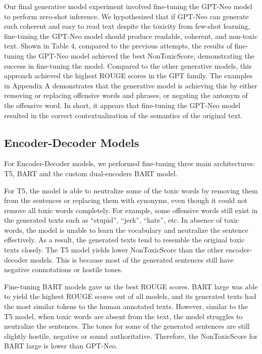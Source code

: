 \documentclass[11pt]{article}
\begin{document}
Our final generative model experiment involved fine-tuning the GPT-Neo model to perform zero-shot inference. We hypothesized that if GPT-Neo can generate such coherent and easy to read text despite the toxicity from few-shot learning, fine-tuning the GPT-Neo model should produce readable, coherent, and non-toxic text. Shown in Table 4, compared to the previous attempts, the results of fine-tuning the GPT-Neo model achieved the best NonToxicScore, demonstrating the success in fine-tuning the model. Compared to the other generative models, this approach achieved the highest ROUGE scores in the GPT family. The examples in Appendix A demonstrates that the generative model is achieving this by either removing or replacing offensive words and phrases, or negating the antonym of the offensive word. In short, it appears that fine-tuning the GPT-Neo model resulted in the correct contextualization of the semantics of the original text.

\subsection{Encoder-Decoder Models}

For Encoder-Decoder models, we performed fine-tuning three main architectures: T5, BART and the custom dual-encoders BART model.

For T5, the model is able to neutralize some of the toxic words by removing them from the sentences or replacing them with synonyms, even though it could not remove all toxic words completely. For example, some offensive words still exist in the generated texts such as “stupid”, “jerk”, “hate”, etc. In absence of toxic words, the model is unable to learn the vocabulary and neutralize the sentence effectively. As a result, the generated texts tend to resemble the original toxic texts closely. The T5 model yields lower NonToxicScore than the other encoder-decoder models. This is because most of the generated sentences still have negative connotations or hostile tones.

Fine-tuning BART models gave us the best ROUGE scores. BART large was able to yield the highest ROUGE scores out of all models, and its generated texts had the most similar tokens to the human annotated texts. However, similar to the T5 model, when toxic words are absent from the text, the model struggles to neutralize the sentences. The tones for some of the generated sentences are still slightly hostile, negative or sound authoritative. Therefore, the NonToxicScore for BART large is lower than GPT-Neo.
\end{document}
